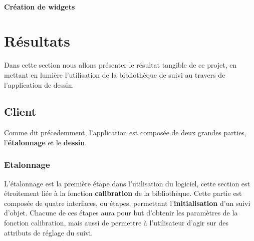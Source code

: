 \documentclass{report}
\begin{document}
				
			\subsubsection{Création de widgets}

	\chapter{Résultats}
		Dans cette section nous allons présenter le résultat tangible de ce projet, en mettant en lumière l'utilisation de la bibliothèque de suivi au travers de l'application de dessin.
			
		
		\section{Client}
			Comme dit précedemment, l'application est composée de deux grandes parties, l'\textbf{étalonnage} et le \textbf{dessin}.
			\subsection{Etalonnage}
				L'étalonnage est la première étape dans l'utilisation du logiciel, cette section est étroitement liée à la fonction \textbf{calibration} de la bibliothèque. Cette partie est composée de quatre interfaces, ou étapes, permettant l'\textbf{initialisation} d'un suivi d'objet. Chacune de ces étapes aura pour but d'obtenir les paramètres de la fonction calibration, mais aussi de permettre à l'utilisateur d'agir sur des attributs de réglage du suivi.
				\newpage
\end{document}
